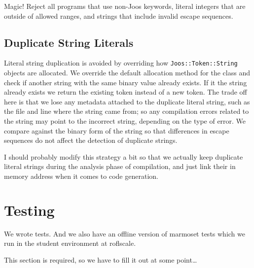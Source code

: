 \documentclass[pdftex,11pt,a4paper]{article}
\begin{document}
Magic! Reject all programs that use non-Joos keywords, literal
integers that are outside of allowed ranges, and strings that include
invalid escape sequences.


\subsection{Duplicate String Literals}

Literal string duplication is avoided by overriding how
\texttt{Joos::Token::String} objects are allocated. We override the
default allocation method for the class and check if another string
with the same binary value already exists. If it the string already
exists we return the existing token instead of a new token. The trade
off here is that we lose any metadata attached to the duplicate
literal string, such as the file and line where the string came from;
so any compilation errors related to the string may point to the
incorrect string, depending on the type of error. We compare against
the binary form of the string so that differences in escape sequences
do not affect the detection of duplicate strings.

I should probably modify this strategy a bit so that we actually keep
duplicate literal strings during the analysis phase of compilation,
and just link their in memory address when it comes to code
generation.


\section{Testing}

We wrote tests. And we also have an offline version of marmoset tests
which we run in the student environment at roflscale.

This section is required, so we have to fill it out at some point\ldots
\end{document}

